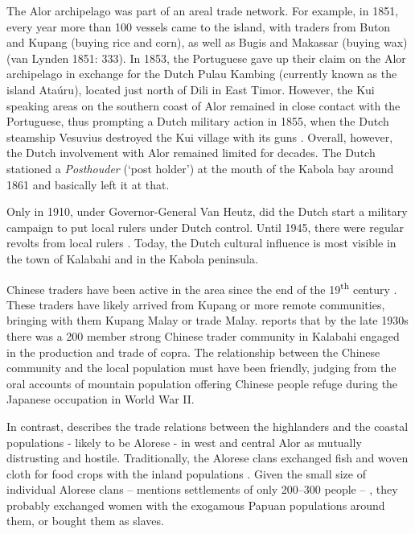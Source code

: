 The Alor archipelago was part of an areal trade network. For example, in 1851, every year more than 100 vessels came to the island, with traders from Buton and Kupang (buying rice and corn), as well as Bugis and Makassar (buying wax) (van Lynden 1851: 333). In 1853, the Portuguese gave up their claim on the Alor archipelago in exchange for the Dutch Pulau Kambing (currently known as the island Ata\'uru), located just north of Dili in East Timor. However, the Kui speaking areas on the southern coast of Alor remained in close contact with the Portuguese, thus prompting a Dutch military action in 1855, when the Dutch steamship Vesuvius destroyed the Kui village with its guns \citep[18--19]{Hagerdal2010galens1}. Overall, however, the Dutch involvement with Alor remained limited for decades. The Dutch stationed a \textit{Posthouder} (`post holder') at the mouth of the Kabola bay around 1861 and basically left it at that.

Only in 1910, under Governor-General Van Heutz, did the Dutch start a military campaign to put local rulers under Dutch control. Until 1945, there were regular revolts from local rulers \citep[see the reports in][2-9]{VanGaalen1945}. Today, the Dutch cultural influence is most visible in the town of Kalabahi and in the Kabola peninsula.

Chinese traders have been active in the area since the end of the 19\textsuperscript{th} century \citep[16]{DuBois1960}. These traders have likely arrived from Kupang or more remote communities, bringing with them Kupang Malay or trade Malay. \citet[1]{Nicolspeyer1940} reports that by the late 1930s there was a 200 member strong Chinese trader community in Kalabahi engaged in the production and trade of copra. The relationship between the Chinese community and the local population must have been friendly, judging from the oral accounts of mountain population offering Chinese people refuge during the Japanese occupation in World War II. 

In contrast, \citet[8]{Nicolspeyer1940} describes the trade relations between the highlanders and the coastal populations - likely to be Alorese - in west and central Alor as mutually distrusting and hostile. Traditionally, the Alorese clans exchanged fish and woven cloth for food crops with the inland populations \citep[cf.][76, 81--82]{Anonymous1914}. Given the small size of individual Alorese clans -- \citet[89--90]{Anonymous1914} mentions settlements of only 200--300 people -- , they probably exchanged women with the exogamous Papuan populations around them, or bought them as slaves.

